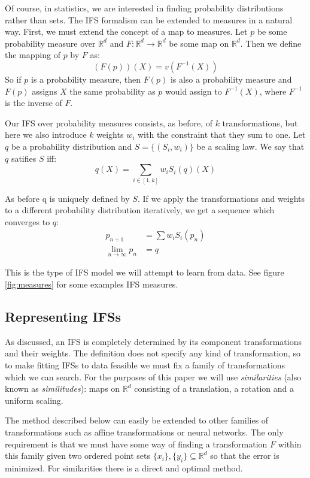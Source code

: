 \documentclass[10pt,a4paper,oneside]{article}
\theoremstyle{definition}
\begin{document}
Of course, in statistics, we are interested in finding probability distributions rather than sets. The IFS formalism can be extended to measures in a natural way. First, we must extend the concept of a map to measures. Let $p$ be some probability measure over ${\mathbb R}^d$ and $F:{\mathbb R}^d \rightarrow {\mathbb R}^d$ be some map on ${\mathbb R}^d$. Then we define the mapping of $p$ by $F$ as:
\[
(F(p))(X) = v(F^{-1}(X))
\]
So if $p$ is a probability measure, then $F(p)$ is also a probability measure and $F(p)$ assigns $X$ the same probability as $p$ would assign to $F^{-1}(X)$, where $F^{-1}$ is the inverse of $F$.

Our IFS over probability measures consists, as before, of $k$ transformations, but here we also introduce $k$ weights $w_i$ with the constraint that they sum to one. Let $q$ be a probability distribution and $S = \{(S_i, w_i)\}$ be a scaling law. We say that $q$ satifies $S$ iff:
\[
q(X) = \sum_{i\in[1, k]} w_i S_i(q)(X)
\] 

As before q is uniquely defined by $S$. If we apply the transformations and weights to a different probability distribution iteratively, we get a sequence which converges to $q$:
\begin{align*}
p_{n+1} &= \sum w_i S_i(p_n) \\
\lim_{n \rightarrow \infty} p_n &= q 
\end{align*}

This is the type of IFS model we will attempt to learn from data. See figure \ref{fig:measures} for some examples IFS measures.

\subsection*{Representing IFSs}

As discussed, an IFS is completely determined by its component transformations and their weights. The definition does not specify any kind of transformation, so to make fitting IFSs to data feasible we must fix a family of transformations which we can search. For the purposes of this paper we will use \emph{similarities} (also known as \emph{similitudes}): maps on ${\mathbb R}^d$ consisting of a translation, a rotation and a uniform scaling.

The method described below can easily be extended to other families of transformations such as affine transformations or neural networks. The only requirement is that we must have some way of finding a transformation $F$ within this family given two ordered point sets $\{x_i\}, \{y_i\} \subseteq {\mathbb R}^d$ so that the error is minimized. For similarities there is a direct and optimal method. \cite{umeyama1991least}
\end{document}
